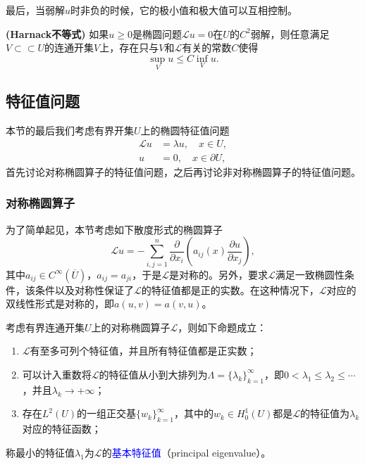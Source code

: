 \documentclass[a4paper,10pt]{ctexart}
\begin{document}
最后，当弱解$ u $时非负的时候，它的极小值和极大值可以互相控制。
\begin{theorem}{\normalfont\textbf{(Harnack不等式)}}
    如果$ u\geqslant 0 $是椭圆问题$ \mathcal{L}u = 0 $在$ U $的$ C^2 $弱解，则任意满足$ V\subset\subset U $的连通开集$ V $上，存在只与$ V $和$ \mathcal{L} $有关的常数$ C $使得
    \begin{equation}
        \sup_{V} u \leqslant C \inf_{V} u.
    \end{equation}
\end{theorem}

\subsection{特征值问题}
本节的最后我们考虑有界开集$ U $上的椭圆特征值问题
\begin{equation}
    \begin{aligned}
        \mathcal{L}u &= \lambda u, \quad x\in U,\\
        u &= 0, \quad x\in \partial U,
    \end{aligned}
\end{equation}
首先讨论对称椭圆算子的特征值问题，之后再讨论非对称椭圆算子的特征值问题。

\subsubsection{对称椭圆算子}
为了简单起见，本节考虑如下散度形式的椭圆算子
\begin{equation}
    \mathcal{L}u = -\sum_{i,j=1}^n \dfrac{\partial}{\partial x_i} \left( a_{ij}(x) \dfrac{\partial u}{\partial x_j} \right) ,
\end{equation}
其中$ a_{ij}\in C^\infty(\overline{U}) $，$ a_{ij} = a_{ji} $，于是$ \mathcal{L} $是对称的。另外，要求$ \mathcal{L} $满足一致椭圆性条件，该条件以及对称性保证了$ \mathcal{L} $的特征值都是正的实数。在这种情况下，$ \mathcal{L} $对应的双线性形式是对称的，即$ a(u,v) = a(v,u) $。

\begin{theorem}
    考虑有界连通开集$ U $上的对称椭圆算子$ \mathcal{L} $，则如下命题成立：
    \begin{enumerate}
        \item $ \mathcal{L} $有至多可列个特征值，并且所有特征值都是正实数；
        \item 可以计入重数将$ \mathcal{L} $的特征值从小到大排列为$ \Lambda = \{\lambda_k\}_{k=1}^\infty $，即$ 0<\lambda_1\leqslant \lambda_2\leqslant \cdots $，并且$ \lambda_k\to +\infty $；
        \item 存在$ L^2(U) $的一组正交基$ \{w_k\}_{k=1}^\infty $，其中的$ w_k\in H^1_0(U) $都是$ \mathcal{L} $的特征值为$ \lambda_k $对应的特征函数；
    \end{enumerate}
    称最小的特征值$ \lambda_1 $为$ \mathcal{L} $的\textcolor{blue}{基本特征值}（principal eigenvalue）。
\end{theorem}
\end{document}
